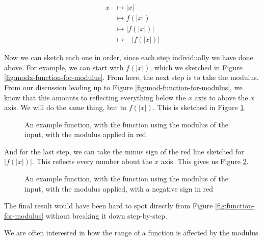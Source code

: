 \begin{align*}
    x &\mapsto |x| \tag{taking the modulus}\\
    &\mapsto f(|x|) \tag{applying $f$}\\
    &\mapsto |f(|x|)| \tag{taking the modulus}\\
    &\mapsto -|f(|x|)| \tag{taking the minus sign}
\end{align*}

Now we can sketch each one in order, since each step individually we have done above. For example, we can 
start with $f(|x|)$, which we sketched in Figure \ref{fig:modx-function-for-modulus}. From here, the next step is to take the modulus.
From our discussion leading up to Figure \ref{fig:mod-function-for-modulus}, we know that this amounts to reflecting everything below the $x$ axis to above the $x$ axis.
We will do the same thing, but to $f(|x|)$. This is sketched in Figure \ref{fig:modmodx-function-for-modulus}.

\begin{figure}[H]
    \centering
    \caption{An example function, with the function using the modulus of the input, with the modulus applied in red}
    \label{fig:modmodx-function-for-modulus}
\end{figure}

And for the last step, we can take the minus sign of the red line sketched for  $|f(|x|)|$. This reflects every number about the $x$ axis. This gives us Figure \ref{fig:minusmodmodx-function-for-modulus}.
\begin{figure}[H]
    \centering
    \caption{An example function, with the function using the modulus of the input, with the modulus applied, with a negative sign in red}
    \label{fig:minusmodmodx-function-for-modulus}
\end{figure}

The final result would have been hard to spot directly from Figure \ref{fig:function-for-modulus} without breaking it down step-by-step.

We are often interested in how the range of a function is affected by the modulus.

